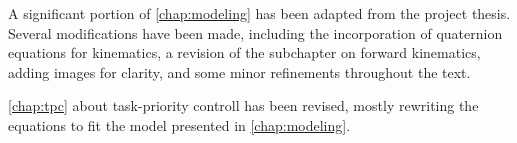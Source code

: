 A significant portion of \autoref{chap:modeling} has been adapted from the 
project thesis. Several modifications have been made, including the 
incorporation of quaternion equations for kinematics, a revision of the 
subchapter on forward kinematics, adding images for clarity, and some minor
refinements throughout the text.

\autoref{chap:tpc} about task-priority controll has been revised, mostly
rewriting the equations to fit the model presented in \autoref{chap:modeling}.

